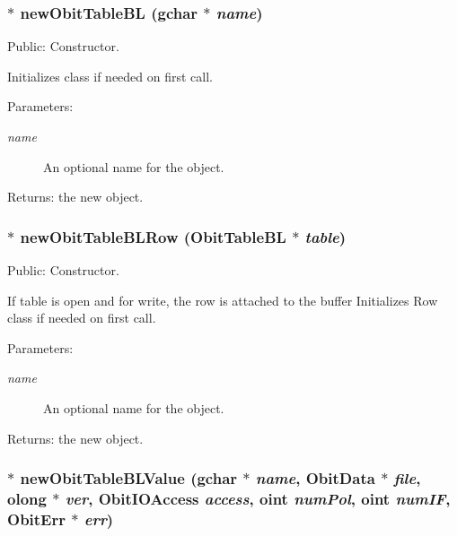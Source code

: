 \subsubsection{$\ast$ new\-Obit\-Table\-BL (gchar $\ast$ {\em name})}\label{ObitTableBL_8c_a16}


Public: Constructor. 

Initializes class if needed on first call. \begin{Desc}
\item[Parameters:]
\begin{description}
\item[{\em name}]An optional name for the object. \end{description}
\end{Desc}
\begin{Desc}
\item[Returns:]the new object. \end{Desc}
\subsubsection{$\ast$ new\-Obit\-Table\-BLRow ({\bf Obit\-Table\-BL} $\ast$ {\em table})}\label{ObitTableBL_8c_a14}


Public: Constructor. 

If table is open and for write, the row is attached to the buffer Initializes Row class if needed on first call. \begin{Desc}
\item[Parameters:]
\begin{description}
\item[{\em name}]An optional name for the object. \end{description}
\end{Desc}
\begin{Desc}
\item[Returns:]the new object. \end{Desc}
\subsubsection{$\ast$ new\-Obit\-Table\-BLValue (gchar $\ast$ {\em name}, {\bf Obit\-Data} $\ast$ {\em file}, {\bf olong} $\ast$ {\em ver}, Obit\-IOAccess {\em access}, {\bf oint} {\em num\-Pol}, {\bf oint} {\em num\-IF}, {\bf Obit\-Err} $\ast$ {\em err})}\label{ObitTableBL_8c_a18}


